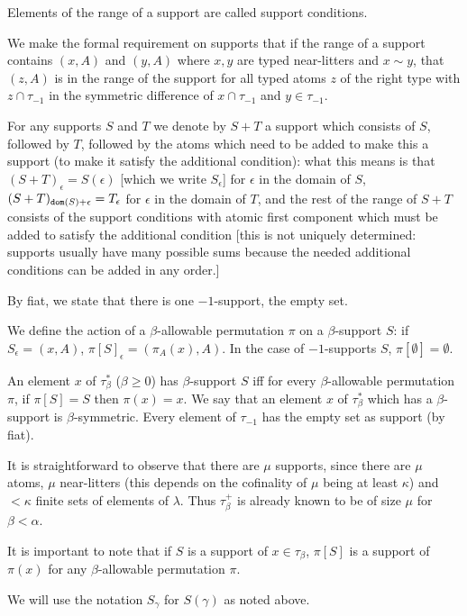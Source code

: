 \documentclass[112pt]{article}
\begin{document}
\begin{description}
Elements of the range of a support are called support conditions.

We make the formal requirement on supports
that if the range of a support contains $(x,A)$ and $(y,A)$ where $x,y$ are typed near-litters and $x \sim y$, that $(z,A)$ is in the range of the support for all typed atoms $z$ of the right type with $z \cap \tau_{-1}$ in the symmetric difference of $x \cap \tau_{-1}$ and $y \in \tau_{-1}$.  

For any supports $S$ and $T$ we denote by $S+T$ a support which consists
of $S$, followed by $T$, followed by the atoms which need to be added to make this a support (to make it satisfy the additional condition):  what this means is that $(S+T)_\epsilon = S(\epsilon)$ [which we write $S_\epsilon$] for $\epsilon$ in the domain of $S$, $(S+T)_{{\tt dom}(S)+\epsilon} = T_\epsilon$ for $\epsilon$ in the domain of $T$, and the rest of the range of $S+T$ consists of the support conditions with atomic first component  which must be added to satisfy the additional condition [this is not uniquely determined:  supports usually have many possible sums because the needed additional conditions can be added in any order.]


By fiat, we state that there is one $-1$-support, the empty set.

We define the action of a $\beta$-allowable permutation $\pi$ on a $\beta$-support $S$:  if $S_\epsilon = (x,A)$, $\pi[S]_\epsilon = (\pi_A(x),A)$.  In the case of $-1$-supports $S$, $\pi[\emptyset]=\emptyset$.

An element $x$ of $\tau^*_\beta$ ($\beta \geq 0$) has $\beta$-support $S$ iff for every $\beta$-allowable permutation $\pi$, if $\pi[S] = S$ then $\pi(x)=x$.  We say that  an element $x$ of $\tau^*_\beta$ which has a $\beta$-support is $\beta$-symmetric. Every element of $\tau_{-1}$ has the empty set as support (by fiat).

It is straightforward to observe that there are $\mu$ supports, since there are $\mu$ atoms, $\mu$ near-litters (this depends on the cofinality of $\mu$ being at least $\kappa$) and
$<\kappa$ finite sets of elements of $\lambda$.  Thus $\tau_\beta^+$ is already known to be of size $\mu$ for $\beta<\alpha$.

It is important to note that if $S$ is a support of $x\in \tau_\beta$, $\pi[S]$ is a support of $\pi(x)$ for any $\beta$-allowable permutation $\pi$.

We will use the notation $S_\gamma$ for $S(\gamma)$ as noted above.


\end{description}
\end{document}
